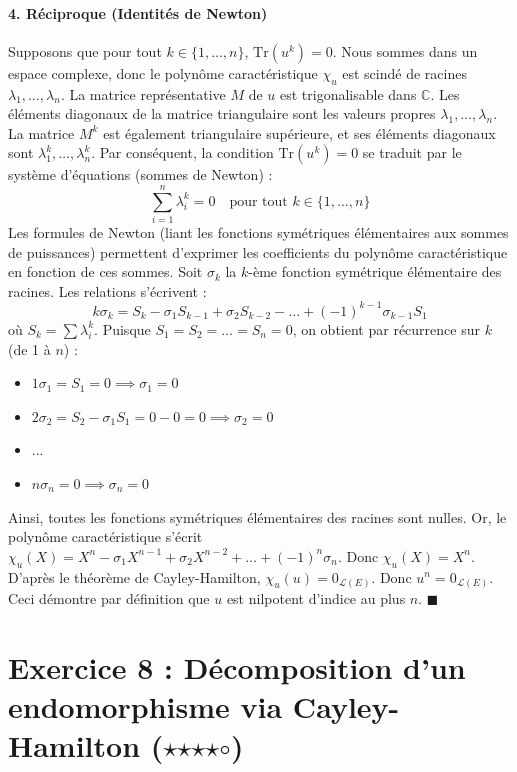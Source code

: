 \documentclass[11pt,a4paper]{article}
\begin{document}
\subsection{4. Réciproque (Identités de Newton)}
Supposons que pour tout $k \in \{1, \dots, n\}$, $\text{Tr}(u^k) = 0$.
Nous sommes dans un espace complexe, donc le polynôme caractéristique $\chi_u$ est scindé de racines $\lambda_1, \dots, \lambda_n$.
La matrice représentative $M$ de $u$ est trigonalisable dans $\mathbb{C}$. Les éléments diagonaux de la matrice triangulaire sont les valeurs propres $\lambda_1, \dots, \lambda_n$.
La matrice $M^k$ est également triangulaire supérieure, et ses éléments diagonaux sont $\lambda_1^k, \dots, \lambda_n^k$.
Par conséquent, la condition $\text{Tr}(u^k) = 0$ se traduit par le système d'équations (sommes de Newton) :
$$\sum_{i=1}^n \lambda_i^k = 0 \quad \text{pour tout } k \in \{1, \dots, n\}$$
Les formules de Newton (liant les fonctions symétriques élémentaires aux sommes de puissances) permettent d'exprimer les coefficients du polynôme caractéristique en fonction de ces sommes.
Soit $\sigma_k$ la $k$-ème fonction symétrique élémentaire des racines. Les relations s'écrivent :
$$k \sigma_k = S_k - \sigma_1 S_{k-1} + \sigma_2 S_{k-2} - \dots + (-1)^{k-1} \sigma_{k-1} S_1$$
où $S_k = \sum \lambda_i^k$.
Puisque $S_1 = S_2 = \dots = S_n = 0$, on obtient par récurrence sur $k$ (de 1 à $n$) :
\begin{itemize}
\item $1 \sigma_1 = S_1 = 0 \implies \sigma_1 = 0$
\item $2 \sigma_2 = S_2 - \sigma_1 S_1 = 0 - 0 = 0 \implies \sigma_2 = 0$
\item ...
\item $n \sigma_n = 0 \implies \sigma_n = 0$
\end{itemize}

Ainsi, toutes les fonctions symétriques élémentaires des racines sont nulles.
Or, le polynôme caractéristique s'écrit $\chi_u(X) = X^n - \sigma_1 X^{n-1} + \sigma_2 X^{n-2} + \dots + (-1)^n \sigma_n$.
Donc $\chi_u(X) = X^n$.
D'après le théorème de Cayley-Hamilton, $\chi_u(u) = 0_{\mathcal{L}(E)}$.
Donc $u^n = 0_{\mathcal{L}(E)}$.
Ceci démontre par définition que $u$ est nilpotent d'indice au plus $n$. $\blacksquare$




\part{Exercice 8 : Décomposition d'un endomorphisme via Cayley-Hamilton ($\star$$\star$$\star$$\star$$\circ$)}
\end{document}
